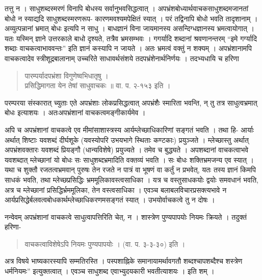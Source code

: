 {तत्तु न । साधुशब्दस्मरणं विनापि बोधस्य सर्वानुभवसिद्धत्वात् । अपभ्रंशबोध्यार्थवाचकसाधुशब्दमजानतां बोधो न स्याद्यदि साधुशब्दस्मरणरूप- कारणमवश्यमपेक्षितं स्यात् । परं तद्विनापि बोधो भवति तादृशानाम् । अव्युत्पन्नानां भ्रमात् बोधः इत्यपि न साधु । बाधज्ञानं विना जायमानस्य असन्दिग्धज्ञानस्य भ्रमत्वायोगात् । यतः यस्मिन् ज्ञाने उत्तरकाले बाधो दृश्यते, तत्रैव भ्रमसम्भवः । गगर्यादि शब्दानां श्रवणानन्तरम् “इमे गर्ग्यादि शब्दाः वाचकत्वाभाववन्तः” इति ज्ञानं कस्यापि न जायते । अतः भ्रमत्वं वक्तुं न शक्यम् । अपभ्रंशानामपि वाचकत्वादेव स्त्रीशूद्रबालानाम् उच्चरिते साधावर्थसंशये तदपभ्रंशेनार्थनिर्णयः । तदभ्यधायि च हरिणा 
\begin{verse}
पारम्पर्यादपभ्रंशा विगुणेष्वभिधातृषु । \\
प्रसिद्धिमागता येन तेषां साधुवाचकः ॥ वा. प. २-१५३ इति ।
\end{verse}
परम्परया संस्कारात् च्युताः एते अपभ्रंशाः लोकप्रसिद्धत्वात्  अपभ्रंशैः स्मारिता भवन्ति, न् तु तत्र साधुत्वभ्रमात् बोधः इत्याशयः । अतःअपभ्रंशानां वाचकत्वमङ्गीकार्यमेव ।

अपि च अपभ्रंशानां वाचकत्वे एव मीमांसाशास्त्रस्य आर्यम्लेच्छाधिकारिणां सङ्गतं भवति । तथा हि- आर्याः अर्थात् शिष्टाः यवशब्दं दीर्घशूके (यवस्योपरि उभयभागे स्थिताः कण्टकाः) प्रयुञ्जते । म्लेच्छास्तु अर्थात् अपभ्रंशवक्तारः यवशब्दं प्रियङ्गौ (धान्यविशेषे) प्रयुज्यते । तमेव च बुद्ध्यते । अपशब्दानां वाचकत्वाभवे यवशब्दात् म्लेच्छानां यो बोधः सः साधुशब्दभ्रमादिति वक्तव्यं भवति । सः बोधः शक्तिभ्रमजन्य एव स्यात् । यथा च शुक्तौ रजतत्वभ्रमवान् पुरुषः तेन रजते न पात्रं वा भूषणं वा कर्तुं न प्रभवेत्, यतः तस्य ज्ञानं किमपि साधकं भवति, तथा म्लेच्छप्रसिद्धिः भ्रममूलिकावस्त्वसाधिका । यत्र च वस्तुसाधकयोः द्वयोः समवधानं भवति, अत्र च म्लेच्छानां प्रसिद्धिर्भ्रममूलिका, तेन वस्त्वसाधिका । एवञ्च बलाबलविचारप्रसक्त्यभावे न आर्यप्रसिद्धेर्बलवत्वबोधकार्थम्लेच्छाधिकरणमसङ्गतं स्यात् । उभयोर्वाचकत्वे तु न दोषः ।

नन्वेवम् अपभ्रंशानां वाचकत्वे साधुत्वापत्तिरिति चेत्, न । शास्त्रेण पुण्यपापयोः नियमः क्रियते । तदुक्तं हरिणा-
\begin{verse}
वाचकत्वाविशेषेऽपि नियमः पुण्यपापयोः । (वा. प. ३-३-३०) इति । 
\end{verse}
अत्र विषये भाष्यकारस्यापि सम्मतिरस्ति । पस्पशाह्निके समानायामर्थावगतौ शब्दश्चापशब्दैश्च शस्त्रेण धर्मनियमः” इत्युक्तत्वात् । एवञ्च साधुशब्द एवाभ्युदयकारी भवतीत्याशयः । इति शम् ।

\articleend
}
